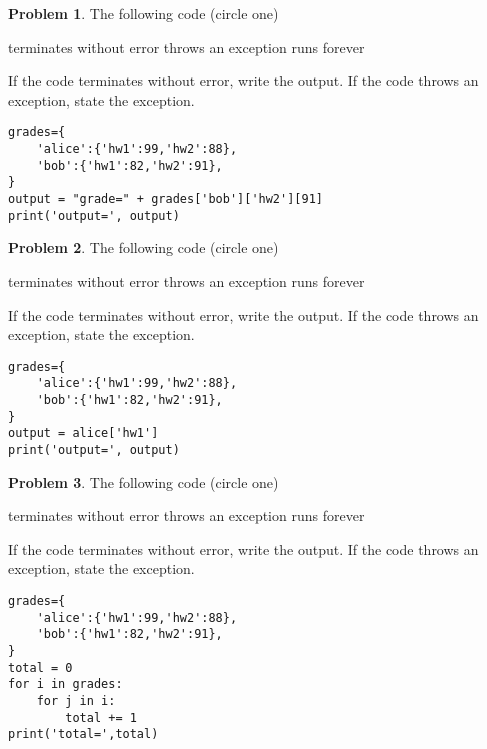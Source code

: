 \documentclass[10pt]{article}
\theoremstyle{definition}
\newtheorem{problem}{Problem}
\begin{document}
\begin{problem}
    The following code (circle one)

    \vspace{0.25in}
    \hspace{0.5in}terminates without error 
    \hspace{1in}throws an exception
    \hspace{1in}runs forever
    \vspace{0.25in}

    \noindent
    If the code terminates without error, write the output.
    If the code throws an exception, state the exception.
\end{problem}
\begin{lstlisting}
grades={
    'alice':{'hw1':99,'hw2':88},
    'bob':{'hw1':82,'hw2':91},
}
output = "grade=" + grades['bob']['hw2'][91]
print('output=', output)
\end{lstlisting}
\vspace{0.75in}


\begin{problem}
    The following code (circle one)

    \vspace{0.25in}
    \hspace{0.5in}terminates without error 
    \hspace{1in}throws an exception
    \hspace{1in}runs forever
    \vspace{0.25in}

    \noindent
    If the code terminates without error, write the output.
    If the code throws an exception, state the exception.
\end{problem}
\begin{lstlisting}
grades={
    'alice':{'hw1':99,'hw2':88},
    'bob':{'hw1':82,'hw2':91},
}
output = alice['hw1']
print('output=', output)
\end{lstlisting}
\vspace{0.75in}


\begin{problem}
    The following code (circle one)

    \vspace{0.25in}
    \hspace{0.5in}terminates without error 
    \hspace{1in}throws an exception
    \hspace{1in}runs forever
    \vspace{0.25in}

    \noindent
    If the code terminates without error, write the output.
    If the code throws an exception, state the exception.
\end{problem}
\begin{lstlisting}
grades={
    'alice':{'hw1':99,'hw2':88},
    'bob':{'hw1':82,'hw2':91},
}
total = 0
for i in grades:
    for j in i:
        total += 1
print('total=',total)
\end{lstlisting}
\vspace{0.75in}
\end{document}
